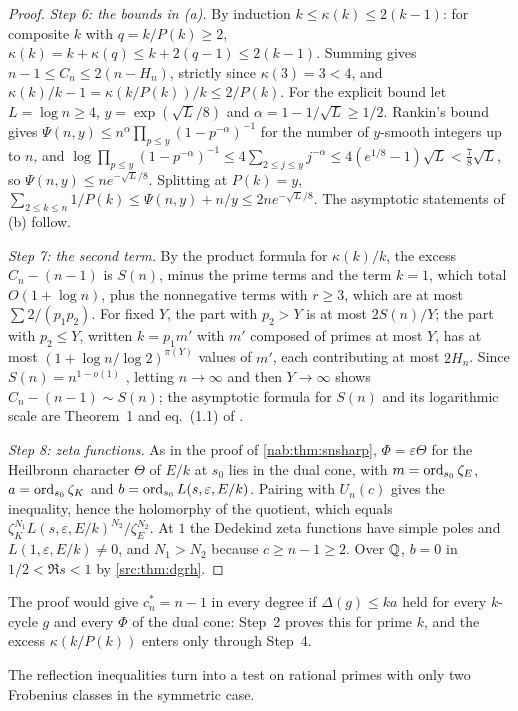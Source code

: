 \begin{proof}
\emph{Step 6: the bounds in \textup{(a)}.} By induction $k\le\kappa(k)\le2(k-1)$: for composite
$k$ with $q=k/P(k)\ge2$, $\kappa(k)=k+\kappa(q)\le k+2(q-1)\le2(k-1)$. Summing gives
$n-1\le C_n\le2(n-H_n)$, strictly since $\kappa(3)=3<4$, and
$\kappa(k)/k-1=\kappa(k/P(k))/k\le2/P(k)$. For the explicit bound let $L=\log n\ge4$,
$y=\exp(\sqrt L/8)$ and $\alpha=1-1/\sqrt L\ge1/2$. Rankin's bound gives
$\Psi(n,y)\le n^\alpha\prod_{p\le y}(1-p^{-\alpha})^{-1}$ for the number of $y$-smooth
integers up to $n$, and
$\log\prod_{p\le y}(1-p^{-\alpha})^{-1}\le4\sum_{2\le j\le y}j^{-\alpha}\le4(e^{1/8}-1)\sqrt L
<\tfrac78\sqrt L$, so $\Psi(n,y)\le ne^{-\sqrt L/8}$. Splitting at $P(k)=y$,
$\sum_{2\le k\le n}1/P(k)\le\Psi(n,y)+n/y\le2ne^{-\sqrt L/8}$. The asymptotic statements of (b)
follow.

\emph{Step 7: the second term.} By the product formula for $\kappa(k)/k$, the excess
$C_n-(n-1)$ is $S(n)$, minus the prime terms and the term $k=1$, which total
$O(1+\log n)$, plus the nonnegative terms with $r\ge3$, which are at most
$\sum2/(p_1p_2)$. For fixed $Y$, the part with $p_2>Y$ is at most $2S(n)/Y$; the part with
$p_2\le Y$, written $k=p_1m'$ with $m'$ composed of primes at most $Y$, has at most
$(1+\log n/\log2)^{\pi(Y)}$ values of $m'$, each contributing at most $2H_n$. Since
$S(n)=n^{1-o(1)}$ \cite{ErdosIvicPomerance1986Sums}, letting $n\to\infty$ and then
$Y\to\infty$ shows $C_n-(n-1)\sim S(n)$; the asymptotic formula for $S(n)$ and its
logarithmic scale are Theorem~1 and eq.~(1.1) of \cite{ErdosIvicPomerance1986Sums}.

\emph{Step 8: zeta functions.} As in the proof of \cref{nab:thm:snsharp}, $\Phi=\varepsilon\Theta$
for the Heilbronn character $\Theta$ of $E/k$ at $s_0$ lies in the dual cone, with
$m=\operatorname{ord}_{s_0}\zeta_E$, $a=\operatorname{ord}_{s_0}\zeta_K$ and $b=\operatorname{ord}_{s_0}L(s,\varepsilon,E/k)$. Pairing
with $U_n(c)$ gives the inequality, hence the holomorphy of the quotient, which equals
$\zeta_K^{N_1}L(s,\varepsilon,E/k)^{N_2}/\zeta_E^{N_2}$. At $1$ the Dedekind zeta functions have simple poles and
$L(1,\varepsilon,E/k)\ne0$, and $N_1>N_2$ because $c\ge n-1\ge2$. Over $\mathbb{Q}$, $b=0$ in
$1/2<\Re s<1$ by \cref{src:thm:dgrh}.
\end{proof}

The proof would give $c_n^*=n-1$ in every degree if $\Delta(g)\le ka$ held for every
$k$-cycle $g$ and every $\Phi$ of the dual cone: Step~2 proves this for prime $k$, and the
excess $\kappa(k/P(k))$ enters only through Step~4.

The reflection inequalities turn into a test on rational primes with only two Frobenius
classes in the symmetric case.

